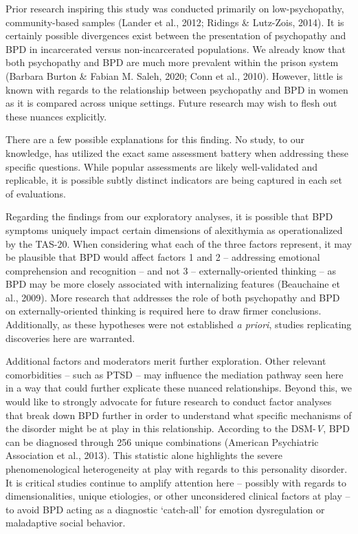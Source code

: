 \documentclass[
  man,floatsintext]{apa7}
\begin{document}
Prior research inspiring this study was conducted primarily on low-psychopathy, community-based samples (Lander et al., 2012; Ridings \& Lutz-Zois, 2014). It is certainly possible divergences exist between the presentation of psychopathy and BPD in incarcerated versus non-incarcerated populations. We already know that both psychopathy and BPD are much more prevalent within the prison system (Barbara Burton \& Fabian M. Saleh, 2020; Conn et al., 2010). However, little is known with regards to the relationship between psychopathy and BPD in women as it is compared across unique settings. Future research may wish to flesh out these nuances explicitly.

There are a few possible explanations for this finding. No study, to our knowledge, has utilized the exact same assessment battery when addressing these specific questions. While popular assessments are likely well-validated and replicable, it is possible subtly distinct indicators are being captured in each set of evaluations.

Regarding the findings from our exploratory analyses, it is possible that BPD symptoms uniquely impact certain dimensions of alexithymia as operationalized by the TAS-20. When considering what each of the three factors represent, it may be plausible that BPD would affect factors 1 and 2 -- addressing emotional comprehension and recognition -- and not 3 -- externally-oriented thinking -- as BPD may be more closely associated with internalizing features (Beauchaine et al., 2009). More research that addresses the role of both psychopathy and BPD on externally-oriented thinking is required here to draw firmer conclusions. Additionally, as these hypotheses were not established \emph{a priori}, studies replicating discoveries here are warranted.

Additional factors and moderators merit further exploration. Other relevant comorbidities -- such as PTSD -- may influence the mediation pathway seen here in a way that could further explicate these nuanced relationships. Beyond this, we would like to strongly advocate for future research to conduct factor analyses that break down BPD further in order to understand what specific mechanisms of the disorder might be at play in this relationship. According to the DSM-\emph{V}, BPD can be diagnosed through 256 unique combinations (American Psychiatric Association et al., 2013). This statistic alone highlights the severe phenomenological heterogeneity at play with regards to this personality disorder. It is critical studies continue to amplify attention here -- possibly with regards to dimensionalities, unique etiologies, or other unconsidered clinical factors at play -- to avoid BPD acting as a diagnostic `catch-all' for emotion dysregulation or maladaptive social behavior.
\end{document}
